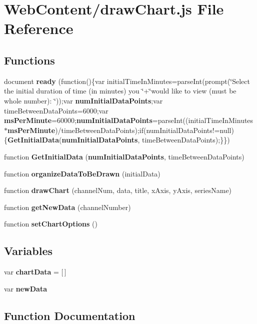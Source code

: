 \section{Web\-Content/draw\-Chart.js File Reference}
\label{draw_chart_8js}
\subsection*{Functions}
\begin{DoxyCompactItemize}
\item 
document {\bf ready} (function()\{var initial\-Time\-In\-Minutes=parse\-Int(prompt(\char`\"{}Select the initial duration of time (in minutes) you \char`\"{}+\char`\"{}would like to view (must be whole number)\-: \char`\"{}));var {\bf num\-Initial\-Data\-Points};var time\-Between\-Data\-Points=6000;var {\bf ms\-Per\-Minute}=60000;{\bf num\-Initial\-Data\-Points}=parse\-Int((initial\-Time\-In\-Minutes $\ast${\bf ms\-Per\-Minute})/time\-Between\-Data\-Points);if(num\-Initial\-Data\-Points!=null)\{{\bf Get\-Initial\-Data}({\bf num\-Initial\-Data\-Points}, time\-Between\-Data\-Points);\}\})
\item 
function {\bf Get\-Initial\-Data} ({\bf num\-Initial\-Data\-Points}, time\-Between\-Data\-Points)
\item 
function {\bf organize\-Data\-To\-Be\-Drawn} (initial\-Data)
\item 
function {\bf draw\-Chart} (channel\-Num, data, title, x\-Axis, y\-Axis, series\-Name)
\item 
function {\bf get\-New\-Data} (channel\-Number)
\item 
function {\bf set\-Chart\-Options} ()
\end{DoxyCompactItemize}
\subsection*{Variables}
\begin{DoxyCompactItemize}
\item 
var {\bf chart\-Data} = [$\,$]
\item 
var {\bf new\-Data}
\end{DoxyCompactItemize}


\subsection{Function Documentation}
